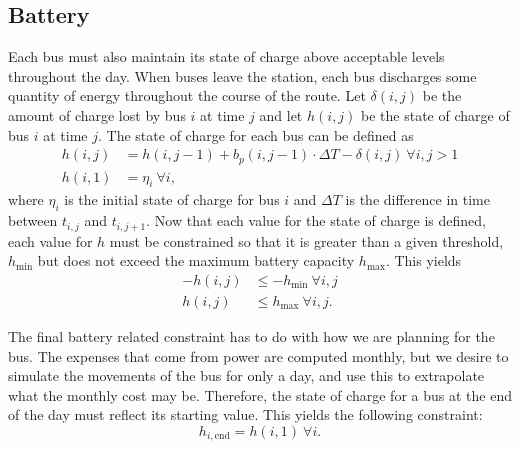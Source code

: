 \subsection{Battery}
\par Each bus must also maintain its state of charge above acceptable levels throughout the day.  When buses leave the station, each bus discharges some quantity of energy throughout the course of the route. Let $\delta(i,j)$ be the amount of charge lost by bus $i$ at time $j$ and let $h(i,j)$ be the state of charge of bus $i$ at time $j$. The state of charge for each bus can be defined as
\begin{equation}\label{eqn:battery:socPropagation}\begin{aligned}
	h(i,j) &= h(i,j-1) + b_p(i,j - 1)\cdot \Delta T - \delta(i,j) \ \forall i,j>1 \\
	h(i,1) &= \eta_i \ \forall i,
\end{aligned}\end{equation}
where $\eta_i$ is the initial state of charge for bus $i$ and $\Delta T$ is the difference in time between $t_{i,j}$ and $t_{i,j+1}$.
Now that each value for the state of charge is defined, each value for $h$ must be constrained so that it is greater than a given threshold, $h_{\text{min}}$ but does not exceed the maximum battery capacity $h_{\text{max}}$. This yields
\begin{equation} \label{eqn:battery:soc}\begin{aligned}
	-h(i,j) &\le -h_{\text{min}}\ \forall i,j \\
	h(i,j) &\le h_{\text{max}} \ \forall i,j. 
\end{aligned}\end{equation}
\par The final battery related constraint has to do with how we are planning for the bus.  The expenses that come from power are computed monthly, but we desire to simulate the movements of the bus for only a day, and use this to extrapolate what the monthly cost may be.  Therefore, the state of charge for a bus at the end of the day must reflect its starting value.  This yields the following constraint:
\begin{equation}\label{eqn:battery:busPower}
	h_{i,\text{end}} = h(i,1) \ \forall i.
\end{equation}

